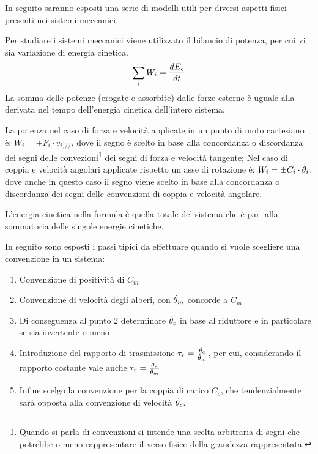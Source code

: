 In seguito saranno esposti una serie di modelli utili per diversi aspetti fisici presenti nei sistemi meccanici.

Per studiare i sistemi meccanici viene utilizzato il bilancio di potenza, per cui vi sia variazione di energia cinetica.
\[\sum_i W_i = \frac{dE_c}{dt}\]
La somma delle potenze (erogate e assorbite) dalle forze esterne è uguale alla derivata nel tempo dell'energia cinetica dell'intero sistema.

La potenza nel caso di forza e velocità applicate in un punto di moto cartesiano è: $W_i=\pm F_i \cdot v_{i,//}$, dove il segno è scelto in base alla concordanza o discordanza dei segni delle convezioni\footnote{Quando si parla di convenzioni si intende una scelta arbitraria di segni che potrebbe o meno rappresentare il verso fisico della grandezza rappresentata.} dei segni di forza e velocità tangente;
Nel caso di coppia e velocità angolari applicate rispetto un asse di rotazione è: $W_i = \pm C_i \cdot \dot{\theta}_i$, dove anche in questo caso il segno viene scelto in base alla concordanza o discordanza dei segni delle convenzioni di coppia e velocità angolare.

L'energia cinetica nella formula è quella totale del sistema che è pari alla sommatoria delle singole energie cinetiche.

In seguito sono esposti i passi tipici da effettuare quando si vuole scegliere una convenzione in un sistema:

\begin{enumerate}
    \item Convenzione di positività di $C_m$
    \item Convenzione di velocità degli alberi, con $\dot{\theta}_m$ concorde a $C_m$
    \item Di conseguenza al punto 2 determinare $\dot{\theta}_c$ in base al riduttore e in particolare se sia invertente o meno
    \item Introduzione del rapporto di trasmissione $\tau_r=\frac{\dot{\theta}_c}{\dot{\theta}_m}$, per cui, considerando il rapporto costante vale anche $\tau_r=\frac{\Ddot{\theta}_c}{\Ddot{\theta}_m}$
    \item Infine scelgo la convenzione per la coppia di carico $C_c$, che tendenzialmente sarà opposta alla convenzione di velocità $\dot{\theta}_c$.
\end{enumerate}

